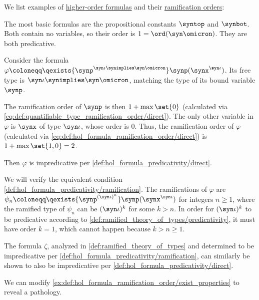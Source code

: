 \begin{example}\label{ex:def:hol_formula_ramification_order}
  We list examples of \hyperref[def:hol_expression/formula]{higher-order formulas} and their \hyperref[def:hol_formula_ramification_order]{ramification orders}:
  \begin{thmenum}
     The most basic formulas are the propositional constants \( \syntop \) and \( \synbot \). Both contain no variables, so their order is \( 1 = \ord(\syn\omicron) \). They are both predicative.

     Consider the formula \( \varphi \coloneqq \qexists {\synp^{\syn\iota \synimplies \syn\omicron}} \synp(\synx^{\syn\iota}) \). Its free type is \( \syn\iota \synimplies \syn\omicron \), matching the type of its bound variable \( \synp \).

    The ramification order of \( \synp \) is then \( 1 + \max\set{ 0 } \) (calculated via \eqref{eq:def:quantifiable_type_ramification_order/direct}). The only other variable in \( \varphi \) is \( \synx \) of type \( \syn\iota \), whose order is \( 0 \). Thus, the ramification order of \( \varphi \) (calculated via \eqref{eq:def:hol_formula_ramification_order/direct}) is \( 1 + \max\set{ 1, 0 } = 2 \).

    Then \( \varphi \) is impredicative per \cref{def:hol_formula_predicativity/direct}.

    We will verify the equivalent condition \cref{def:hol_formula_predicativity/ramification}. The ramifications of \( \varphi \) are \( \psi_n \coloneqq \qexists {\synp^{(\syn\iota)^n}} \synp(\synx^{\syn\iota}) \) for integers \( n \geq 1 \), where the ramified type of \( \psi_n \) can be \( (\syn\iota)^k \) for some \( k > n \). In order for \( (\syn\iota)^k \) to be predicative according to \cref{def:ramified_theory_of_types/predicativity}, it must have order \( k = 1 \), which cannot happen because \( k > n \geq 1 \).

    The formula \( \zeta \), analyzed in \cref{def:ramified_theory_of_types} and determined to be impredicative per \cref{def:hol_formula_predicativity/ramification}, can similarly be shown to also be impredicative per \cref{def:hol_formula_predicativity/direct}.

     We can modify \cref{ex:def:hol_formula_ramification_order/exist_properties} to reveal a pathology.


\end{thmenum}
\end{example}
